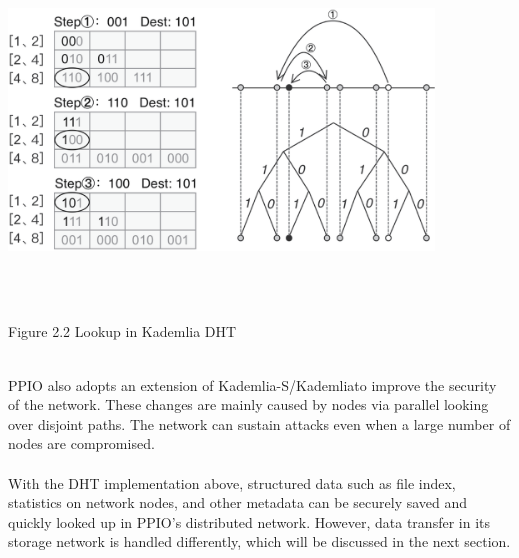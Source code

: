 \documentclass[10pt,a4paper]{article}
\begin{document}
 \vspace{-0.3em}
  \\
\\ \centerline{\includegraphics[width=320pt]{fig2}}
\\\\ \centerline{{Figure 2.2 Lookup in Kademlia DHT}}
\vspace{-0.5em}
\\
PPIO also adopts an extension of Kademlia-S/Kademlia\cite{article23}to improve the security of the network. These changes are mainly caused by nodes via parallel looking over disjoint paths.  The network can sustain attacks even when a large number of nodes are compromised.
\vspace{-0.5em}
  \\ \\With the DHT implementation above, structured data such as file index, statistics on network nodes, and other metadata can be securely saved and quickly looked up in PPIO’s distributed network. However, data transfer in its storage network is handled differently, which will be discussed in the next section.
  \vspace{-0.5em}
\end{document}
